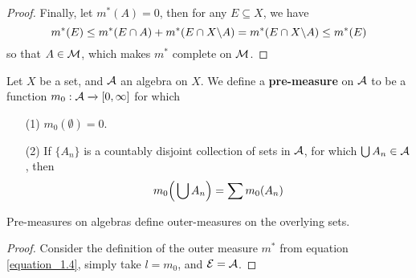 \begin{proof}
    Finally, let $m^\ast(A)=0$, then for any $E \subseteq X$, we have
    \begin{equation*}
        m^\ast(E) \leq m^\ast(E \cap A)+m^\ast(E \cap X \backslash A)=
        m^\ast(E \cap X \backslash A) \leq m^\ast(E)
    \end{equation*}
    so that $A \in \mathcal{M}$, which makes $m^\ast$ complete on $\mathcal{M}$.
\end{proof}

\begin{definition}
    Let $X$ be a set, and  $\mathcal{A}$ an algebra on  $X$. We define a
    \textbf{pre-measure} on $\mathcal{A}$ to be a function  $m_0:\mathcal{A} \xrightarrow{}
    [0,\infty]$ for which
    \begin{enumerate}
        \item[(1)] $m_0(\emptyset)=0$.

        \item[(2)] If $\{A_n\}$ is a countably disjoint collection of sets in
            $\mathcal{A}$, for which  $\bigcup{A_n} \in \mathcal{A}$, then
            \begin{equation}\label{equation_1.6}
                m_0\Big{(} \bigcup{A_n} \Big{)}=\sum{m_0(A_n)}
            \end{equation}
    \end{enumerate}
\end{definition}

\begin{lemma}\label{lemma_1.3.4}
    Pre-measures on algebras define outer-measures on the overlying sets.
\end{lemma}
\begin{proof}
    Consider the definition of the outer measure $m^\ast$ from equation
    \ref{equation_1.4}, simply take $l=m_0$, and $\mathcal{E}=\mathcal{A}$.
\end{proof}

